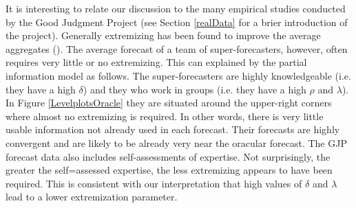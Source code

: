 \documentclass[11pt]{article}
\theoremstyle{definition}
\theoremstyle{definition}
\begin{document}

It is interesting to relate our discussion to the many empirical  studies conducted by the Good Judgment Project (see Section \ref{realData} for a brier introduction of the project).
Generally extremizing has been found to improve the average 
aggregates (\citealt{mellers2014psychological, satopaa, satopaa2014probability}).  The average 
forecast of a team of super-forecasters, however, often 
requires very little or no extremizing.  This can explained by 
the partial information model as follows.  The super-forecasters 
are highly knowledgeable (i.e. they have a high $\delta$) 
and they who work in groups (i.e. they have a high $\rho$ and 
$\lambda$).  In Figure \ref{LevelplotsOracle} 
they are situated around the upper-right corners where almost 
no extremizing is required.  In other words, there is very little
usable information not already used in each forecast.  Their
forecasts are highly convergent and are likely to be already very near
the oracular forecast.  The GJP forecast data also includes 
self-assessments of expertise.  Not surprisingly, the greater
the self=assessed expertise, the less extremizing appears to 
have been required.  This is consistent with our interpretation
that high values of $\delta$ and $\lambda$ lead to a lower
extremization parameter.
\end{document}
